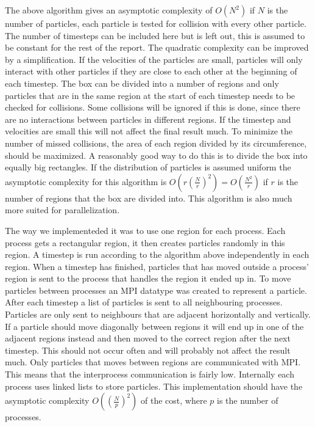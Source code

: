 \documentclass[a4paper,11pt]{article}
\begin{document}
The above algorithm gives an asymptotic complexity of $O(N^2)$ if $N$ is the number of particles, each particle is tested for collision with every other particle.
The number of timesteps can be included here but is left out, this is assumed to be constant for the rest of the report.
The quadratic complexity can be improved by a simplification.
If the velocities of the particles are small, particles will only interact with other particles if they are close to each other at the beginning of each timestep.
The box can be divided into a number of regions and only particles that are in the same region at the start of each timestep needs to be checked for collisions.
Some collisions will be ignored if this is done, since there are no interactions between particles in different regions.
If the timestep and velocities are small this will not affect the final result much.
To minimize the number of missed collisions, the area of each region divided by its circumference, should be maximized.
A reasonably good way to do this is to divide the box into equally big rectangles.
If the distribution of particles is assumed uniform the asymptotic complexity for this algorithm is $O(r(\frac{N}{r})^2) = O(\frac{N^2}{r})$ if $r$ is the number of regions that the box are divided into.
This algorithm is also much more suited for parallelization.

The way we implementeded it was to use one region for each process.
Each process gets a rectangular region, it then creates particles randomly in this region.
A timestep is run according to the algorithm above independently in each region.
When a timestep has finished, particles that has moved outside a process' region is sent to the process that handles the region it ended up in.
To move particles between processes an MPI datatype was created to represent a particle.
After each timestep a list of particles is sent to all neighbouring processes.
Particles are only sent to neighbours that are adjacent horizontally and vertically.
If a particle should move diagonally between regions it will end up in one of the adjacent regions instead and then moved to the correct region after the next timestep.
This should not occur often and will probably not affect the result much.
Only particles that moves between regions are communicated with MPI.
This means that the interprocess communication is fairly low.
Internally each process uses linked lists to store particles.
This implementation should have the asymptotic complexity $O((\frac{N}{p})^2)$ of the cost, where $p$ is the number of processes.
\end{document}
